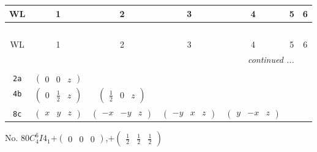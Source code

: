 \documentclass[fleqn,9pt,landscape]{jsarticle}
\begin{document}
\begin{center}
\renewcommand{\arraystretch}{1.2}
\begin{longtable}{ccccccc}
 \hline \hline
WL & 1 & 2 & 3 & 4 & 5 & 6 \\ \hline \endfirsthead

\multicolumn{6}{l}{\tablename\ \thetable{}} \\
 \hline \hline
WL & 1 & 2 & 3 & 4 & 5 & 6 \\ \hline \endhead

 \hline \hline
\multicolumn{6}{r}{\footnotesize\it continued ...} \\ \endfoot

 \hline \hline
\multicolumn{6}{r}{} \\ \endlastfoot

{\tt 2a} & $ \begin{pmatrix} 0 & 0 & z \end{pmatrix} $ & $  $ & $  $ & $  $ \\ \hline
{\tt 4b} & $ \begin{pmatrix} 0 & \frac{1}{2} & z \end{pmatrix} $ & $ \begin{pmatrix} \frac{1}{2} & 0 & z \end{pmatrix} $ & $  $ & $  $ \\ \hline
{\tt 8c} & $ \begin{pmatrix} x & y & z \end{pmatrix} $ & $ \begin{pmatrix} - x & - y & z \end{pmatrix} $ & $ \begin{pmatrix} - y & x & z \end{pmatrix} $ & $ \begin{pmatrix} y & - x & z \end{pmatrix} $ \\
\end{longtable}
\end{center}
\newpage
No. 80\quad$C_{4}^{6}$\quad$I4_1$\quad[ tetragonal ]\quad$+\begin{pmatrix} 0 & 0 & 0 \end{pmatrix}$,\quad $+\begin{pmatrix} \frac{1}{2} & \frac{1}{2} & \frac{1}{2} \end{pmatrix}$
\end{document}
